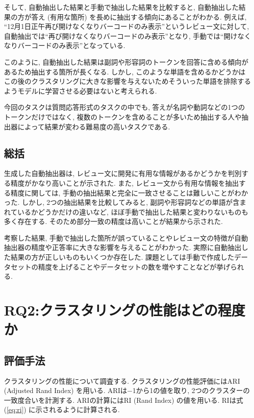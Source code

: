 そして, 自動抽出した結果と手動で抽出した結果を比較すると, 自動抽出した結果の方が答え (有用な箇所) を長めに抽出する傾向にあることがわかる. 
例えば, ``12月1日正午再び開けなくなりバーコードのみ表示''というレビュー文に対して, 自動抽出では``再び開けなくなりバーコードのみ表示''となり, 手動では``開けなくなりバーコードのみ表示''となっている. 

このように, 自動抽出した結果は副詞や形容詞のトークンを回答に含める傾向があるため抽出する箇所が長くなる. しかし, このような単語を含めるかどうかはこの後のクラスタリングに大きな影響を与えないためそういった単語を排除するようモデルに学習させる必要はないと考えられる. 

今回のタスクは質問応答形式のタスクの中でも, 答えが名詞や動詞などの1つのトークンだけではなく, 複数のトークンを含めることが多いため抽出する人や抽出器によって結果が変わる難易度の高いタスクである. 


\subsection{総括}
生成した自動抽出器は, レビュー文に開発に有用な情報があるかどうかを判別する精度がかなり高いことが示された. 
また, レビュー文から有用な情報を抽出する精度に関しては, 手動の抽出結果と完全に一致させることは難しいことがわかった. しかし, 2つの抽出結果を比較してみると, 副詞や形容詞などの単語が含まれているかどうかだけの違いなど, ほぼ手動で抽出した結果と変わりないものも多く存在する. そのため部分一致の精度は高いことが結果から示された. 

考察した結果, 手動で抽出した箇所が誤っていることやレビュー文の特徴が自動抽出器の精度や正答率に大きな影響を与えることがわかった. 実際に自動抽出した結果の方が正しいものもいくつか存在した. 課題としては手動で作成したデータセットの精度を上げることやデータセットの数を増やすことなどが挙げられる. 


\section{RQ2:クラスタリングの性能はどの程度か}
\subsection{評価手法}
クラスタリングの性能について調査する. クラスタリングの性能評価にはARI (Adjusted Rand Index) を用いる. ARIは$-$1から1の値を取り, 2つのクラスターの一致度合いを計測する. 
ARIの計算にはRI (Rand Index) の値を用いる. RIは式 (\ref{eq:ri}) に示されるように計算される. 

